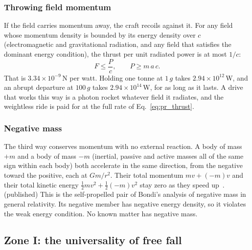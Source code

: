 \subsubsection{Throwing field momentum}
If the field carries momentum away, the craft recoils against it. For any field whose momentum density is bounded by its energy density over $c$
(electromagnetic and gravitational radiation, and any field that satisfies the dominant energy condition), the thrust per unit radiated power is at
most $1/c$:
\begin{equation}
F\le\frac{P}{c},\qquad P\ge m\,a\,c .
\label{eq:pr_thrust}
\end{equation}
\derived{} That is $3.34\times10^{-9}$\,N per watt. Holding one tonne at $1\,g$ takes $2.94\times10^{12}$\,W, and an abrupt departure at $100\,g$
takes $2.94\times10^{14}$\,W, for as long as it lasts. \calc{} A drive that works this way is a photon rocket whatever field it radiates, and the
weightless ride is paid for at the full rate of Eq.~\eqref{eq:pr_thrust}. \derived

\subsubsection{Negative mass}
The third way conserves momentum with no external reaction. A body of mass $+m$ and a body of mass $-m$ (inertial, passive and active masses all of the
same sign within each body) both accelerate in the same direction, from the negative toward the positive, each at $Gm/r^2$. Their total momentum
$mv+(-m)v$ and their total kinetic energy $\tfrac12mv^2+\tfrac12(-m)v^2$ stay zero as they speed up~\cite{Bondi1957}. \derived{} (published) This is the
self-propelled pair of Bondi's analysis of negative mass in general relativity. Its negative member has negative energy density, so it violates the
weak energy condition. \derived{} No known matter has negative mass. \observed

\subsection{Zone I: the universality of free fall}\label{sec:pr_universal}

